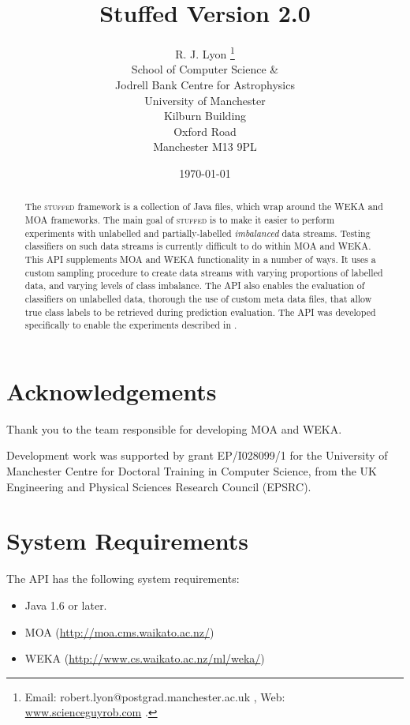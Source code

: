\documentclass[twoside,a4paper]{refart}
\title{Stuffed Version 2.0}
\author{R. J. Lyon \thanks{Email: robert.lyon@postgrad.manchester.ac.uk , Web: \protect\url{www.scienceguyrob.com} .}\\
School of Computer Science \& \\
Jodrell Bank Centre for Astrophysics\\
University of Manchester\\
Kilburn Building\\
Oxford Road\\
Manchester M13 9PL\\
\date{\today}  
}
\date{}
\begin{document}
\maketitle

\begin{abstract}
The \textsc{stuffed} framework is a collection of Java files, which wrap around the WEKA and MOA frameworks.
The main goal of \textsc{stuffed} is to make it easier to perform experiments with unlabelled and partially-labelled \textit{imbalanced} data streams. Testing classifiers on such data streams is currently difficult to do within MOA and WEKA.\\

This API supplements MOA and WEKA functionality in a number of ways. It uses a custom sampling procedure to create data streams with varying proportions of labelled data, and varying levels of class imbalance. The API also enables the evaluation of classifiers on unlabelled data, thorough the use of custom meta data files, that allow true class labels to be retrieved during prediction evaluation. The API was developed specifically to enable the experiments described in \cite{Lyon:2013:jk,Lyon:2014:jk}.
\end{abstract}
\newpage

\tableofcontents

\newpage



\section{Acknowledgements}
Thank you to the team responsible for developing MOA and WEKA. 

Development work was supported by grant EP/I028099/1 for the University of Manchester Centre for Doctoral Training in Computer Science, from the UK Engineering and Physical Sciences Research Council (EPSRC).

\section{System Requirements}
The API has the following system requirements:
\begin{itemize}
\item Java 1.6 or later.
\item \textsc{MOA} (\url{http://moa.cms.waikato.ac.nz/})
\item \textsc{WEKA} (\url{http://www.cs.waikato.ac.nz/ml/weka/})
\end{itemize}
\end{document}
